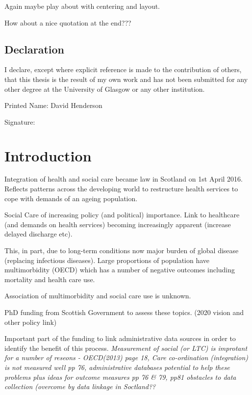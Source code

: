 \documentclass[12pt,]{report}
\begin{document}
\fancyhead[CO,CE]{} 

Again maybe play about with centering and layout.

How about a nice quotation at the end???

\newpage

\section*{Declaration}

\fancyhead[CO,CE]{} 

I declare, except where explicit reference is made to the contribution
of others, that this thesis is the result of my own work and has not
been submitted for any other degree at the University of Glasgow or any
other institution.

Printed Name: David Henderson

Signature:

\newpage


\newpage


\chapter{Introduction}\label{ch:intro}

Integration of health and social care became law in Scotland on 1st
April 2016. Reflects patterns across the developing world to restructure
health services to cope with demands of an ageing population.

Social Care of increasing policy (and political) importance. Link to
healthcare (and demands on health services) becoming increasingly
apparent (increase delayed discharge etc).

This, in part, due to long-term conditions now major burden of global
disease (replacing infectious diseases). Large proportions of population
have multimorbidity (OECD) which has a number of negative outcomes
including mortality and health care use.

Association of multimorbidity and social care use is unknown.

PhD funding from Scottish Government to assess these topics. (2020
vision and other policy link)

Important part of the funding to link administrative data sources in
order to identify the benefit of this process. \emph{Measurement of
social (or LTC) is improtant for a number of reseons - OECD(2013) page
18, Care co-ordination (integration) is not measured well pp 76,
administrative databases potential to help these problems plus ideas for
outcome measures pp 76 \& 79, pp81 obstacles to data collection
(overcome by data linkage in Soctland??}
\end{document}
